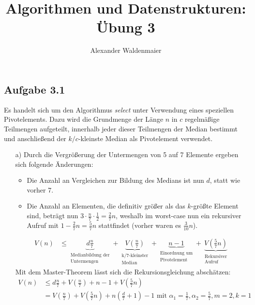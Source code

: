 \documentclass{article}
\title{Algorithmen und Datenstrukturen: Übung 3}
\author{Alexander Waldenmaier}
\begin{document}
    \maketitle

    \subsection*{Aufgabe 3.1}
    Es handelt sich um den Algorithmus \textit{select} unter Verwendung eines speziellen Pivotelements. Dazu wird die Grundmenge der Länge $n$ in $c$ regelmäßige Teilmengen aufgeteilt, innerhalb jeder dieser Teilmengen der Median bestimmt und anschließend der $k/c$-kleinste Median als Pivotelement verwendet. 
    \begin{enumerate}
        \item[a)] Durch die Vergrößerung der Untermengen von 5 auf 7 Elemente ergeben sich folgende Änderungen:
        \begin{itemize}
            \item Die Anzahl an Vergleichen zur Bildung des Medians ist nun $d$, statt wie vorher 7.
            \item Die Anzahl an Elementen, die definitiv größer als das $k$-größte Element sind, beträgt nun $3\cdot \frac{n}{7}\cdot \frac{1}{2}=\frac{2}{7}n$, weshalb im worst-case nun ein rekursiver Aufruf mit $1-\frac{2}{7}n = \frac{5}{7}n$ stattfindet (vorher waren es $\frac{3}{10}n$).
        \end{itemize} 
        \begin{align*}
            V(n) &\le \underbrace{d\frac{n}{7}}_{\substack{\text{Medianbildung der} \\ \text{Untermengen}}} + \underbrace{V\left(\frac{n}{7}\right)}_{\substack{\text{k/7-kleinster} \\ \text{Median}}} + \underbrace{n-1}_{\substack{\text{Einordnung um} \\ \text{Pivotelement}}} + \underbrace{V\left(\frac{5}{7}n\right)}_{\substack{\text{Rekursiver} \\ \text{Aufruf}}}
        \end{align*}
        Mit dem Master-Theorem lässt sich die Rekursionsgleichung abschätzen:
        \begin{align*}
            V(n) &\le d\frac{n}{7} + V\left(\frac{n}{7}\right) + n - 1 + V\left(\frac{5}{7}n\right)\\
            &= V\left(\frac{n}{7}\right) + V\left(\frac{5}{7}n\right) + n\left(\frac{d}{7} + 1\right) - 1 \text{ mit } \alpha_1 = \frac{1}{7}, \alpha_2 = \frac{5}{7}, m = 2, k = 1\\

\end{align*}
\end{enumerate}
\end{document}
